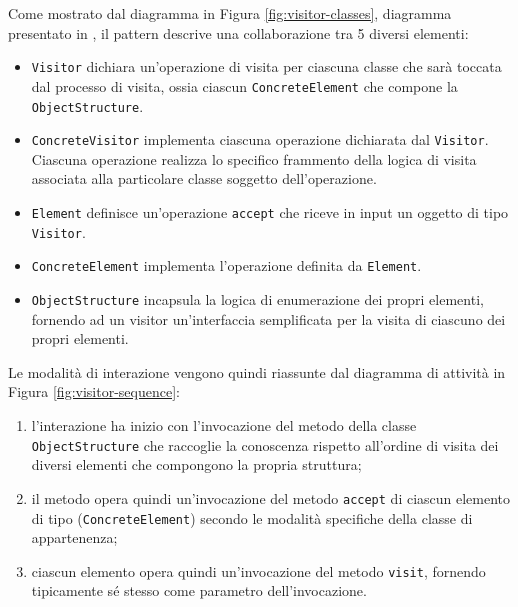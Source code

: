 Come mostrato dal diagramma in Figura \ref{fig:visitor-classes}, diagramma
presentato in \cite{gamma1995design}, il pattern descrive una collaborazione tra
5 diversi elementi:

\begin{itemize}

\item \texttt{Visitor} dichiara un'operazione di visita per ciascuna classe che
sarà toccata dal processo di visita, ossia ciascun \texttt{ConcreteElement} che
compone la \texttt{ObjectStructure}.

\item \texttt{ConcreteVisitor} implementa ciascuna operazione dichiarata dal
\texttt{Visitor}. Ciascuna operazione realizza lo specifico frammento della
logica di visita associata alla particolare classe soggetto dell'operazione.

\item \texttt{Element} definisce un'operazione \texttt{accept} che riceve in
input un oggetto di tipo \texttt{Visitor}.

\item \texttt{ConcreteElement} implementa l'operazione definita da \texttt
{Element}.

\item \texttt{ObjectStructure} incapsula la logica di enumerazione dei propri
elementi, fornendo ad un visitor un'interfaccia semplificata per la visita di
ciascuno dei propri elementi.

\end{itemize}

Le modalità di interazione vengono quindi riassunte dal diagramma di attività
in Figura \ref{fig:visitor-sequence}:

\begin{enumerate}

\item l'interazione ha inizio con l'invocazione del metodo della classe
\texttt{ObjectStructure} che raccoglie la conoscenza rispetto all'ordine di
visita dei diversi elementi che compongono la propria struttura;

\item il metodo opera quindi un'invocazione del metodo \texttt{accept} di
ciascun elemento di tipo (\texttt{ConcreteElement}) secondo le modalità specifiche della classe di appartenenza;

\item ciascun elemento opera quindi un'invocazione del metodo \texttt{visit},
fornendo tipicamente sé stesso come parametro dell'invocazione.

\end{enumerate}

